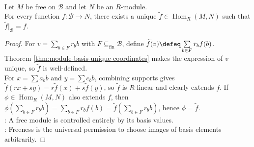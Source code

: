 \begin{theorem} \label{thm:free-module-map-extension} \\
Let $M$ be free on $\mathcal{B}$ and let $N$ be an $R$-module.\\
For every function $f:\mathcal{B}\to N$, there exists a unique $\widetilde{f}\in\operatorname{Hom}_R(M,N)$ such that $\widetilde{f}|_{\mathcal{B}}=f$.
\begin{proof} For $v=\sum\limits_{b\in F}r_bb$ with $F\subseteq_{\operatorname{fin}}\mathcal{B}$, define $\widetilde{f}(v)\defeq\sum\limits_{b\in F}r_bf(b)$.\\
Theorem \ref{thm:module-basis-unique-coordinates} makes the expression of $v$ unique, so $\widetilde{f}$ is well-defined.\\
For $x=\sum a_bb$ and $y=\sum c_bb$, combining supports gives $\widetilde{f}(rx+sy)=r\widetilde{f}(x)+s\widetilde{f}(y)$, so $\widetilde{f}$ is $R$-linear and clearly extends $f$. If $\phi\in\operatorname{Hom}_R(M,N)$ also extends $f$, then $\phi\left(\sum\limits_{b\in F}r_bb\right)=\sum\limits_{b\in F}r_bf(b)=\widetilde{f}\left(\sum\limits_{b\in F}r_bb\right)$, hence $\phi=\widetilde{f}$.\\
: A free module is controlled entirely by its basis values.\\
: Freeness is the universal permission to choose images of basis elements arbitrarily.
\end{proof}
\end{theorem}

